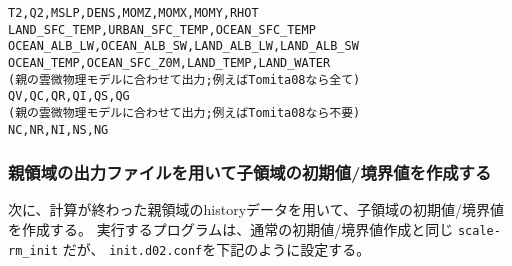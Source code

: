 \begin{alltt}
  T2, Q2, MSLP, DENS, MOMZ, MOMX, MOMY, RHOT
  LAND_SFC_TEMP, URBAN_SFC_TEMP, OCEAN_SFC_TEMP
  OCEAN_ALB_LW, OCEAN_ALB_SW, LAND_ALB_LW, LAND_ALB_SW
  OCEAN_TEMP, OCEAN_SFC_Z0M, LAND_TEMP, LAND_WATER
(親の雲微物理モデルに合わせて出力; 例えばTomita08なら全て)
  QV, QC, QR, QI, QS, QG
(親の雲微物理モデルに合わせて出力; 例えばTomita08なら不要)
  NC, NR, NI, NS, NG
\end{alltt}



\subsubsection{親領域の出力ファイルを用いて子領域の初期値/境界値を作成する}
次に、計算が終わった親領域のhistoryデータを用いて、子領域の初期値/境界値を作成する。
実行するプログラムは、通常の初期値/境界値作成と同じ \verb|scale-rm_init| だが、
\verb|init.d02.conf|を下記のように設定する。\\

